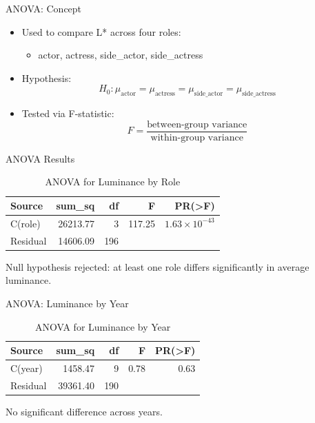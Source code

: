 \documentclass{beamer}
\begin{document}
\begin{frame}{ANOVA: Concept}
  \begin{itemize}
    \item Used to compare L* across four roles:
    \begin{itemize}
      \item actor, actress, side\_actor, side\_actress
    \end{itemize}
    \item Hypothesis:
    \[ H_0: \mu_\text{actor} = \mu_\text{actress} = \mu_\text{side\_actor} = \mu_\text{side\_actress} \]
    \item Tested via F-statistic:
    \[ F = \frac{\text{between-group variance}}{\text{within-group variance}} \]
  \end{itemize}
\end{frame}

\begin{frame}{ANOVA Results}
  \begin{table}[]
    \centering
    \begin{tabular}{lrrrr}
    \toprule
    Source & sum\_sq & df & F & PR(>F) \\
    \midrule
    C(role) & 26213.77 & 3 & 117.25 & $1.63 \times 10^{-43}$ \\
    Residual & 14606.09 & 196 & & \\
    \bottomrule
    \end{tabular}
    \caption{ANOVA for Luminance by Role}
  \end{table}
  \small Null hypothesis rejected: at least one role differs significantly in average luminance.
\end{frame}

\begin{frame}{ANOVA: Luminance by Year}
  \begin{table}[]
    \centering
    \begin{tabular}{lrrrr}
    \toprule
    Source & sum\_sq & df & F & PR(>F) \\
    \midrule
    C(year) & 1458.47 & 9 & 0.78 & 0.63 \\
    Residual & 39361.40 & 190 & & \\
    \bottomrule
    \end{tabular}
    \caption{ANOVA for Luminance by Year}
  \end{table}
  \small No significant difference across years.
\end{frame}
\end{document}
